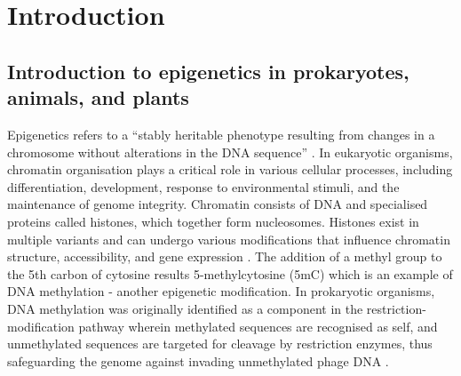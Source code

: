 
\chapter{Introduction}  %

\ifpdf
    \graphicspath{{Chapter1/Figs/Raster/}{Chapter1/Figs/PDF/}{Chapter1/Figs/}}
\else
    \graphicspath{{Chapter1/Figs/Vector/}{Chapter1/Figs/}}
\fi


\section{Introduction to epigenetics in prokaryotes, animals, and plants } %

Epigenetics refers to a “stably heritable phenotype resulting from changes in a chromosome without alterations in the DNA sequence” \cite{RN135}. In eukaryotic organisms, chromatin organisation plays a critical role in various cellular processes, including differentiation, development, response to environmental stimuli, and the maintenance of genome integrity. Chromatin consists of DNA and specialised proteins called histones, which together form nucleosomes. Histones exist in multiple variants and can undergo various modifications that influence chromatin structure, accessibility, and gene expression \cite{RN289,RN284}. The addition of a methyl group to the 5th carbon of cytosine results 5-methylcytosine (5mC) which is an example of DNA methylation - another epigenetic modification. In prokaryotic organisms, DNA methylation was originally identified as a component in the restriction-modification pathway wherein methylated sequences are recognised as self, and unmethylated sequences are targeted for cleavage by restriction enzymes, thus safeguarding the genome against invading unmethylated phage DNA \cite{RN96,RN95}.

